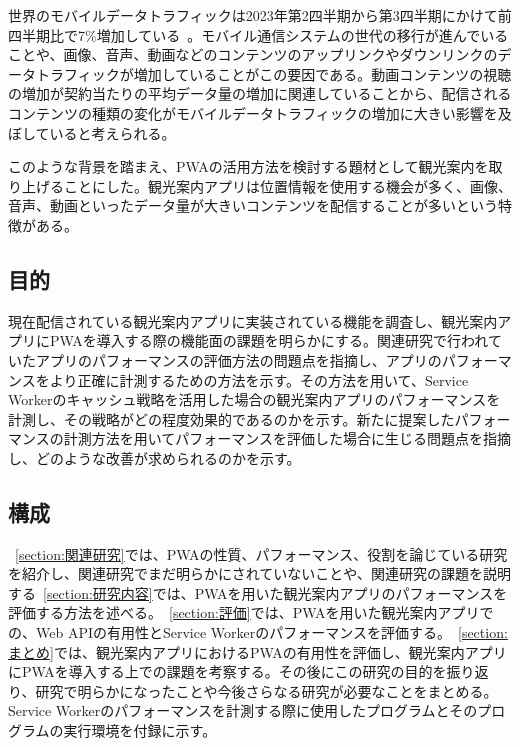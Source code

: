 世界のモバイルデータトラフィックは2023年第2四半期から第3四半期にかけて前四半期比で7\%増加している~\cite{EricssonNovember2023MobilityReportDataAndForecasts}。モバイル通信システムの世代の移行が進んでいることや、画像、音声、動画などのコンテンツのアップリンクやダウンリンクのデータトラフィックが増加していることがこの要因である。動画コンテンツの視聴の増加が契約当たりの平均データ量の増加に関連していることから、配信されるコンテンツの種類の変化がモバイルデータトラフィックの増加に大きい影響を及ぼしていると考えられる。

このような背景を踏まえ、PWAの活用方法を検討する題材として観光案内を取り上げることにした。観光案内アプリは位置情報を使用する機会が多く、画像、音声、動画といったデータ量が大きいコンテンツを配信することが多いという特徴がある。

\subsection{目的}
\label{subsection:目的}
現在配信されている観光案内アプリに実装されている機能を調査し、観光案内アプリにPWAを導入する際の機能面の課題を明らかにする。関連研究で行われていたアプリのパフォーマンスの評価方法の問題点を指摘し、アプリのパフォーマンスをより正確に計測するための方法を示す。その方法を用いて、Service Workerのキャッシュ戦略を活用した場合の観光案内アプリのパフォーマンスを計測し、その戦略がどの程度効果的であるのかを示す。新たに提案したパフォーマンスの計測方法を用いてパフォーマンスを評価した場合に生じる問題点を指摘し、どのような改善が求められるのかを示す。
\subsection{構成}
\label{subsection:構成}
~\autoref{section:関連研究}では、PWAの性質、パフォーマンス、役割を論じている研究を紹介し、関連研究でまだ明らかにされていないことや、関連研究の課題を説明する~\autoref{section:研究内容}では、PWAを用いた観光案内アプリのパフォーマンスを評価する方法を述べる。~\autoref{section:評価}では、PWAを用いた観光案内アプリでの、Web APIの有用性とService Workerのパフォーマンスを評価する。~\autoref{section:まとめ}では、観光案内アプリにおけるPWAの有用性を評価し、観光案内アプリにPWAを導入する上での課題を考察する。その後にこの研究の目的を振り返り、研究で明らかになったことや今後さらなる研究が必要なことをまとめる。Service Workerのパフォーマンスを計測する際に使用したプログラムとそのプログラムの実行環境を付録に示す。